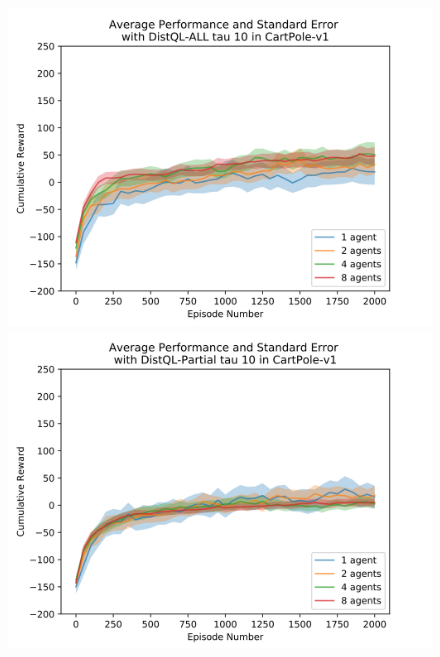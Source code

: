 \documentclass[jair,twoside,11pt,theapa]{article}
\begin{document}
\begin{figure}[h]
	\centering
	\begin{minipage}{.5\textwidth}
		\centering
		\includegraphics[width=1\linewidth]{resultImages/binned-Average-Performance-and-Standard-Error-with-DistQL-ALL-tau-10-in-CartPole-v1}
		\caption{}
		\label{fig:DistQL-ALL-tau-10-env-CartPole}
	\end{minipage}%
	\begin{minipage}{.5\textwidth}
		\centering
		\includegraphics[width=1\linewidth]{resultImages/binned-Average-Performance-and-Standard-Error-with-DistQL-Partial-tau-10-in-CartPole-v1}
		\caption{}
		\label{fig:DistQL-Partial-tau-10-env-CartPole}
	\end{minipage}
\end{figure}
\end{document}
